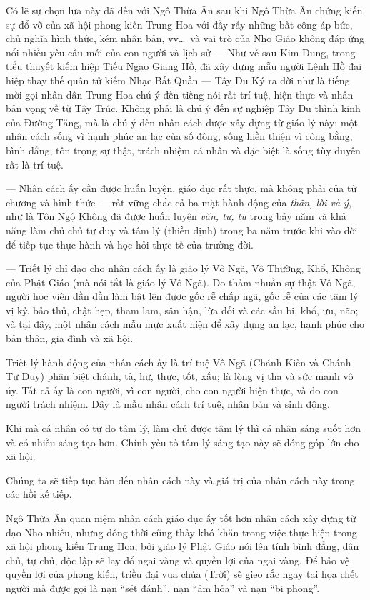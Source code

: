 Có lẽ sự chọn lựa này đã đến với Ngô Thừa Ân sau khi Ngô Thừa Ân chứng kiến sự đổ vỡ của xã hội phong kiến Trung Hoa với đầy rẫy những bất công áp bức, chủ nghĩa hình thức, kém nhân bản, vv\ldots ~và vai trò của Nho Giáo không đáp ứng nổi nhiều yêu cầu mới của con người và lịch sử — Như về sau Kim Dung, trong tiểu thuyết kiếm hiệp Tiếu Ngạo Giang Hồ, đã xây dựng mẫu người Lệnh Hồ đại hiệp thay thế quân tử kiếm Nhạc Bất Quần — Tây Du Ký ra đời như là tiếng mời gọi nhân dân Trung Hoa chú ý đến tiếng nói rất trí tuệ, hiện thực và nhân bản vọng về từ Tây Trúc. Không phải là chú ý đến sự nghiệp Tây Du thỉnh kinh của Đường Tăng, mà là chú ý đến nhân cách được xây dựng từ giáo lý này: một nhân cách sống vì hạnh phúc an lạc của số đông, sống hiền thiện vì công bằng, bình đẳng, tôn trọng sự thật, trách nhiệm cá nhân và đặc biệt là sống tùy duyên rất là trí tuệ.

— Nhân cách ấy cần được huấn luyện, giáo dục rất thực, mà không phải của từ chương và hình thức — rất vững chắc cả ba mặt hành động của \emph{thân, lời và ý}, như là Tôn Ngộ Không đã được huấn luyện \emph{văn, tư, tu} trong bảy năm và khả năng làm chủ chủ tư duy và tâm lý (thiền định) trong ba năm trước khi vào đời để tiếp tục thực hành và học hỏi thực tế của trường đời.

— Triết lý chỉ đạo cho nhân cách ấy là giáo lý Vô Ngã, Vô Thường, Khổ, Không của Phật Giáo (mà nói tắt là giáo lý Vô Ngã). Do thấm nhuần sự thật Vô Ngã, người học viên dần dần làm bật lên được gốc rễ chấp ngã, gốc rễ của các tâm lý vị kỷ. bảo thủ, chật hẹp, tham lam, sân hận, lừa dối và các sầu bi, khổ, ưu, não; và tại đây, một nhân cách mẫu mực xuất hiện để xây dựng an lạc, hạnh phúc cho bản thân, gia đình và xã hội.

Triết lý hành động của nhân cách ấy là trí tuệ Vô Ngã (Chánh Kiến và Chánh Tư Duy) phân biệt chánh, tà, hư, thực, tốt, xấu; là lòng vị tha và sức mạnh vô úy. Tất cả ấy là con người, vì con người, cho con người hiện thực, và do con người trách nhiệm. Đây là mẫu nhân cách trí tuệ, nhân bản và sinh động.

Khi mà cá nhân có tự do tâm lý, làm chủ được tâm lý thì cá nhân sáng suốt hơn và có nhiều sáng tạo hơn. Chính yếu tố tâm lý sáng tạo này sẽ đóng góp lớn cho xã hội.

Chúng ta sẽ tiếp tục bàn đến nhân cách này và giá trị của nhân cách này trong các hồi kế tiếp.

Ngô Thừa Ân quan niệm nhân cách giáo dục ấy tốt hơn nhân cách xây dựng từ đạo Nho nhiều, nhưng đồng thời cũng thấy khó khăn trong việc thực hiện trong xã hội phong kiến Trung Hoa, bởi giáo lý Phật Giáo nói lên tính bình đẳng, dân chủ, tự chủ, độc lập sẽ lay đổ ngai vàng và quyền lợi của ngai vàng. Để bảo vệ quyền lợi của phong kiến, triều đại vua chúa (Trời) sẽ gieo rắc ngay tai họa chết người mà được gọi là nạn ``sét đánh'', nạn ``âm hỏa'' và nạn ``bi phong''.

